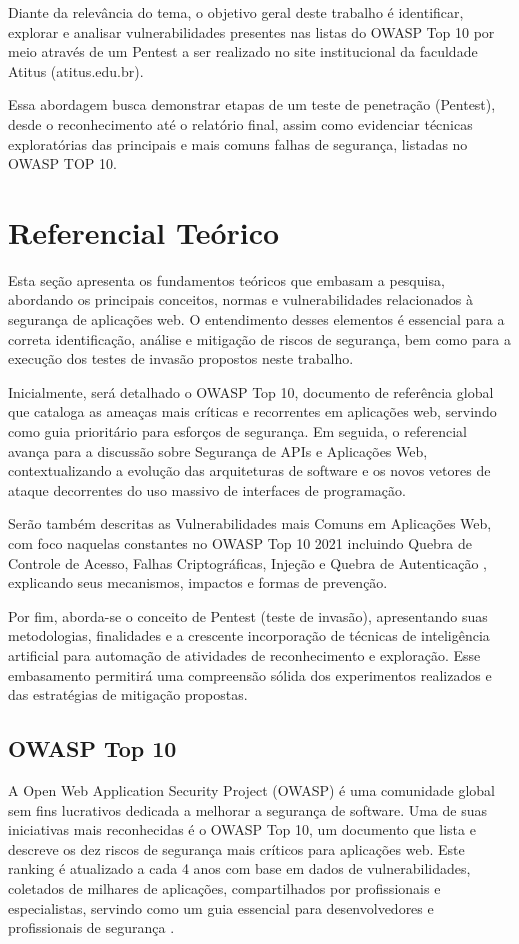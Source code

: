 \documentclass[12pt]{article}
\begin{document}
Diante da relevância do tema, o objetivo geral deste trabalho é identificar, explorar e analisar vulnerabilidades presentes nas listas do OWASP Top 10 por meio através de um Pentest
 a ser realizado no site institucional da faculdade Atitus (atitus.edu.br).

Essa abordagem busca demonstrar etapas de um teste de penetração (Pentest), desde o reconhecimento até o relatório final, assim como evidenciar técnicas exploratórias das principais
 e mais comuns falhas de segurança, listadas no OWASP TOP 10.
\section{Referencial Teórico}
Esta seção apresenta os fundamentos teóricos que embasam a pesquisa, abordando os principais conceitos, normas e vulnerabilidades relacionados 
à segurança de aplicações web. O entendimento desses elementos é essencial para a correta identificação, análise e mitigação de riscos de segurança,
 bem como para a execução dos testes de invasão propostos neste trabalho.

Inicialmente, será detalhado o OWASP Top 10, documento de referência global que cataloga as ameaças mais críticas e recorrentes em aplicações web,
 servindo como guia prioritário para esforços de segurança. Em seguida, o referencial avança para a discussão sobre Segurança de APIs e Aplicações Web,
  contextualizando a evolução das arquiteturas de software e os novos vetores de ataque decorrentes do uso massivo de interfaces de programação.

Serão também descritas as Vulnerabilidades mais Comuns em Aplicações Web, com foco naquelas constantes no OWASP Top 10 2021  incluindo 
Quebra de Controle de Acesso, Falhas Criptográficas, Injeção e Quebra de Autenticação , explicando seus mecanismos, impactos e formas de prevenção.

Por fim, aborda-se o conceito de Pentest (teste de invasão), apresentando suas metodologias, finalidades e a crescente incorporação de técnicas de inteligência 
artificial para automação de atividades de reconhecimento e exploração. Esse embasamento permitirá uma compreensão sólida dos experimentos realizados e das 
estratégias de mitigação propostas.

    
\subsection{OWASP Top 10}
    A Open Web Application Security Project (OWASP) é uma comunidade global sem fins lucrativos dedicada a melhorar a segurança de software. 
    Uma de suas iniciativas mais reconhecidas é o OWASP Top 10, um documento que lista e descreve os dez riscos de segurança mais críticos 
    para aplicações web. Este ranking é atualizado a cada 4 anos com base em dados de vulnerabilidades, coletados de milhares de aplicações, 
    compartilhados por profissionais e especialistas, servindo como um guia essencial para desenvolvedores e profissionais de segurança \cite{owasp10}.
\end{document}
